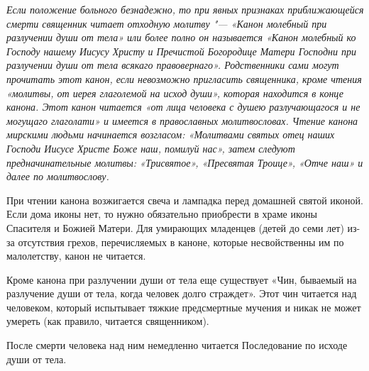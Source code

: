 

\label{_content_molitvi-pered-smertyu}

 

\begin{mymulticols}
 


{\itshape Если положение больного безнадежно, то при явных признаках приближающейся смерти священник читает отходную молитву "--- «Канон молебный при разлучении души от тела» или более полно он называется «Канон молебный ко Господу нашему Иисусу Христу и Пречистой Богородице Матери Господни при разлучении души от тела всякаго правовернаго». Родственники сами могут прочитать этот канон, если невозможно пригласить священника, кроме чтения «молитвы, от иерея глаголемой на исход души», которая находится в конце канона. Этот канон читается «от лица человека с душею разлучающагося и не могущаго глаголати» и имеется в православных молитвословах. Чтение канона мирскими людьми начинается возгласом: «Молитвами святых отец наших Господи Иисусе Христе Боже наш, помилуй нас», затем следуют предначинательные молитвы: «Трисвятое», «Пресвятая Троице», «Отче наш» и далее по молитвослову. 

При чтении канона возжигается свеча и лампадка перед домашней святой иконой. Если дома иконы нет, то нужно обязательно приобрести в храме иконы Спасителя и Божией Матери. Для умирающих младенцев (детей до семи лет) из-за отсутствия грехов, перечисляемых в каноне, которые несвойственны им по малолетству, канон не читается. 

Кроме канона при разлучении души от тела еще существует «Чин, бываемый на разлучение души от тела, когда человек долго страждет». Этот чин читается над человеком, который испытывает тяжкие предсмертные мучения и никак не может умереть (как правило, читается священником). 

После смерти человека над ним немедленно читается Последование по исходе души от тела. 

} 

\end{mymulticols}

\mychapterending


